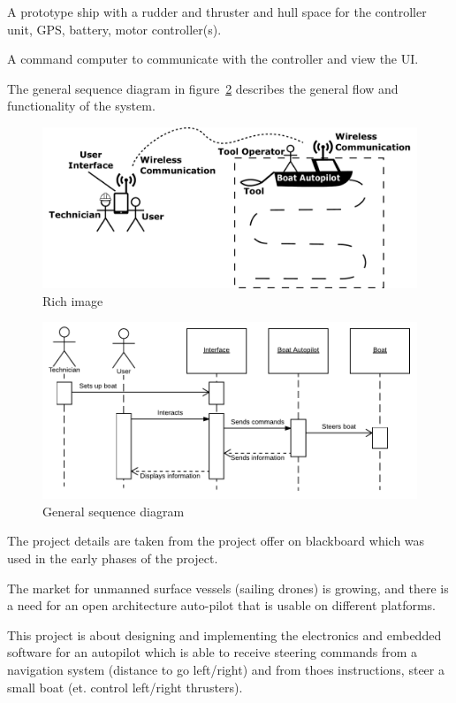 A prototype ship with a rudder and thruster and hull space for the controller unit, GPS, battery, motor controller(s).

A command computer to communicate with the controller and view the UI.

The general sequence diagram in figure~\ref{fig:general_sd} describes the general flow and functionality of the system.

\begin{figure}[H]
	\centering
	\includegraphics[width=1\linewidth]{Images/Introduction/rich_image}
	\caption{Rich image}
	\label{fig:rich_image}
\end{figure}

\begin{figure}[H]
	\centering
	\includegraphics[width=1\linewidth]{Images/Introduction/General_SD}
	\caption{General sequence diagram}
	\label{fig:general_sd}
\end{figure}

The project details are taken from the project offer on blackboard\cite{problem-description} which was used in the early phases of the project.

The market for unmanned surface vessels (sailing drones) is growing, and there is a need for an open architecture auto-pilot that is usable on different platforms.

This project is about designing and implementing the electronics and embedded software for an autopilot which is able to receive steering commands from a navigation system (distance to go left/right) and from thoes instructions, steer a small boat (et. control left/right thrusters).


